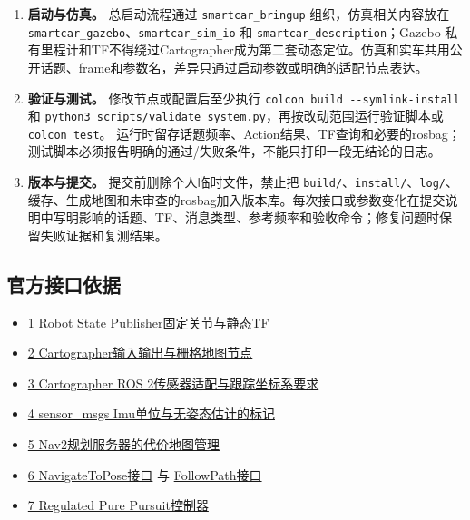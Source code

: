 \documentclass[UTF8,fontset=fandol,11pt,a4paper]{ctexart}
\begin{document}
{\begin{enumerate}
\item \textbf{启动与仿真。} 总启动流程通过 \nolinkurl{smartcar_bringup} 组织，仿真相关内容放在 \nolinkurl{smartcar_gazebo}、\nolinkurl{smartcar_sim_io} 和 \nolinkurl{smartcar_description}；Gazebo 私有里程计和TF不得绕过Cartographer成为第二套动态定位。仿真和实车共用公开话题、frame和参数名，差异只通过启动参数或明确的适配节点表达。
\item \textbf{验证与测试。} 修改节点或配置后至少执行 \nolinkurl{colcon build --symlink-install} 和 \nolinkurl{python3 scripts/validate_system.py}，再按改动范围运行验证脚本或 \nolinkurl{colcon test}。
运行时留存话题频率、Action结果、TF查询和必要的rosbag；测试脚本必须报告明确的通过/失败条件，不能只打印一段无结论的日志。
\item \textbf{版本与提交。} 提交前删除个人临时文件，禁止把 \nolinkurl{build/}、\nolinkurl{install/}、\nolinkurl{log/}、缓存、生成地图和未审查的rosbag加入版本库。每次接口或参数变化在提交说明中写明影响的话题、TF、消息类型、参考频率和验收命令；修复问题时保留失败证据和复测结果。
\end{enumerate}
}

\subsection{官方接口依据}
\begin{itemize}
\item \href{https://github.com/ros/robot_state_publisher/tree/jazzy}{1 Robot State Publisher固定关节与静态TF}
\item \href{https://google-cartographer-ros.readthedocs.io/en/latest/ros_api.html}{2 Cartographer输入输出与栅格地图节点}
\item \href{https://github.com/ros2/cartographer_ros/blob/ros2/cartographer_ros/src/sensor_bridge.cpp}{3 Cartographer ROS 2传感器适配与跟踪坐标系要求}
\item \href{https://github.com/ros2/common_interfaces/blob/jazzy/sensor_msgs/msg/Imu.msg}{4 sensor\_msgs Imu单位与无姿态估计的标记}
\item \href{https://github.com/ros-navigation/navigation2/blob/jazzy/nav2_planner/src/planner_server.cpp}{5 Nav2规划服务器的代价地图管理}
\item \href{https://github.com/ros-navigation/navigation2/blob/jazzy/nav2_msgs/action/NavigateToPose.action}{6 NavigateToPose接口} 与 \href{https://github.com/ros-navigation/navigation2/blob/jazzy/nav2_msgs/action/FollowPath.action}{FollowPath接口}
\item \href{https://docs.nav2.org/jazzy/configuration_and_development/configuration_guide/controller_plugins/configuring_regulated_pp/}{7 Regulated Pure Pursuit控制器}
\end{itemize}
\end{document}
